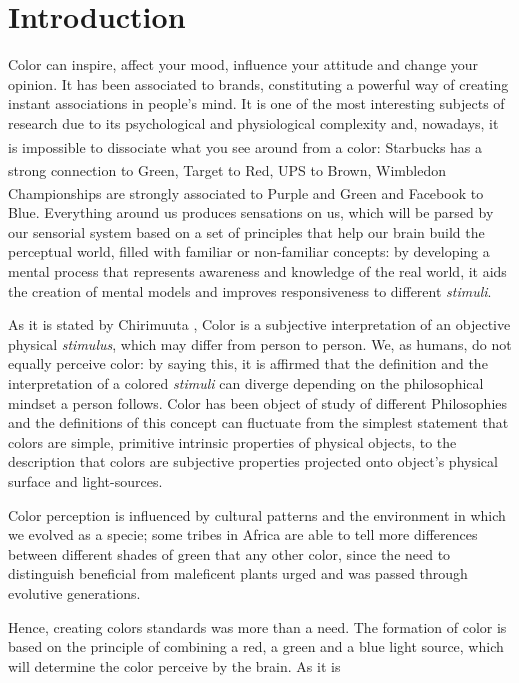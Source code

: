\documentclass{report}
\begin{document}
\chapter{Introduction}
%
Color can inspire, affect your mood, influence your attitude and change your opinion. It has been associated
to brands, constituting a powerful way of creating instant
associations in people’s mind. It is one of the most interesting subjects of research due to its psychological
and physiological complexity and, nowadays, it is impossible to dissociate what you see around
from a color: Starbucks\textsuperscript{\textregistered} has a strong connection to Green, 
Target\textsuperscript{\textregistered} to Red, UPS\textsuperscript{\textregistered} to Brown, Wimbledon
Championships\textsuperscript{\textregistered} are strongly associated to Purple and Green and Facebook\textsuperscript{\textregistered} to Blue.
Everything around us produces sensations on us, which will be parsed by our sensorial system based on a set
of principles that help our brain build the perceptual world, filled with familiar or non-familiar concepts:
by developing a mental process that represents awareness and knowledge of the real world, it aids the creation
of mental models and improves responsiveness to different \emph{stimuli}. \par
As it is stated by Chirimuuta \cite{Chirimuuta2014}, Color is a subjective interpretation of an objective physical \emph{stimulus}, which
may differ from person to person. We, as humans, do not equally perceive color: by saying this, it is affirmed
that the definition and the interpretation of a colored \emph{stimuli} can diverge depending on the philosophical mindset
a person follows. Color has been object of study of different Philosophies and the definitions of this concept
can fluctuate from the simplest statement that colors are simple, primitive intrinsic properties of physical objects,
to the description that colors are subjective properties projected onto object’s physical surface and light-sources. \par
Color perception is influenced by cultural patterns and the environment in which we evolved as a
specie; some tribes in Africa are able to tell more differences between different shades of green that any other
color, since the need to distinguish beneficial from maleficent plants urged and was passed through evolutive generations. \par
Hence, creating colors standards was more than a need. The formation of color is based on the principle of
combining a red, a green and a blue light source, which will determine the color perceive by the brain. As it is
\end{document}
